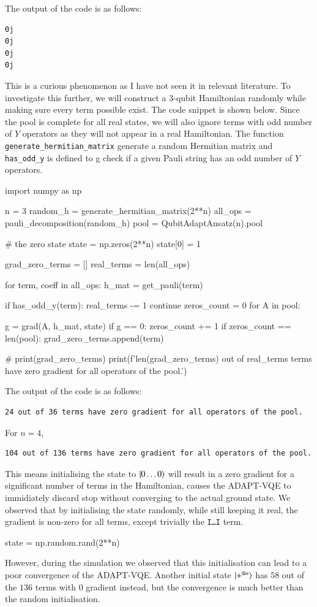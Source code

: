 The output of the code is as follows:
\begin{verbatim}
0j
0j
0j
0j
\end{verbatim}

This is a curious phenomenon as I have not seen it in relevant literature. To investigate this further, we will construct a 3-qubit Hamiltonian randomly while making sure every term possible exist. The code snippet is shown below. Since the pool is complete for all real states, we will also ignore terms with odd number of $ Y $ operators as they will not appear in a real Hamiltonian. The function \texttt{generate\_hermitian\_matrix} generate a random Hermitian matrix and \texttt{has\_odd\_y} is defined to g check if a given Pauli string has an odd number of $ Y $ operators.
\begin{mycode}
import numpy as np

n = 3
random_h = generate_hermitian_matrix(2**n)
all_ops = pauli_decomposition(random_h)
pool = QubitAdaptAnsatz(n).pool

# the zero state
state = np.zeros(2**n)
state[0] = 1

grad_zero_terms = []
real_terms = len(all_ops)

for term, coeff in all_ops:
	h_mat = get_pauli(term)
	
	if has_odd_y(term):
		real_terms -= 1
		continue
	zeros_count = 0
	for A in pool:
		
	    g = grad(A, h_mat, state)
	    if g == 0:
		    zeros_count += 1
	    if zeros_count == len(pool):
		    grad_zero_terms.append(term)

# print(grad_zero_terms)
print(f'{len(grad_zero_terms)} out of {real_terms} terms have zero gradient for all operators of the pool.')
\end{mycode}

The output of the code is as follows:
\begin{verbatim}
24 out of 36 terms have zero gradient for all operators of the pool.
\end{verbatim}
For $ n=4 $, 
\begin{verbatim}
104 out of 136 terms have zero gradient for all operators of the pool.
\end{verbatim}
This means initialising the state to $ \ket{0\ldots0} $ will result in a zero gradient for a significant number of terms in the Hamiltonian, causes the ADAPT-VQE to immidiately discard stop without converging to the actual ground state. We observed that by initialising the state randomly, while still keeping it real, the gradient is non-zero for all terms, except trivially the \texttt{I\ldots I} term.
\begin{mycode}
state = np.random.rand(2**n)
\end{mycode}
However, during the simulation we observed that this initialisation can lead to a poor convergence of the ADAPT-VQE. Another initial state \(\ket{+^{\otimes n}}\) has $ 58 $ out of the $ 136 $ terms with $ 0 $ gradient instead, but the convergence is much better than the random initialisation. 

